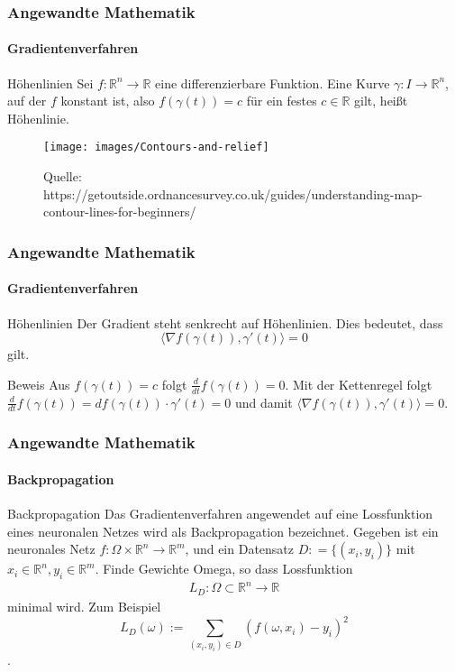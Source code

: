 \documentclass{beamer}
\begin{document}
\begin{frame}
    \frametitle{Angewandte Mathematik}
\framesubtitle{Gradientenverfahren}
    \begin{block}{Höhenlinien}
Sei  $f: \mathbb{R}^n \to \mathbb{R}$  eine differenzierbare Funktion. Eine Kurve $\gamma : I \to \mathbb{R}^n$, auf der $f$ konstant ist, also 
$f(\gamma(t)) = c$ für ein festes $c \in \mathbb{R}$ gilt, heißt Höhenlinie.
\end{block}

\begin{figure}[H]
      \centering
    \texttt{[image: images/Contours-and-relief]}
      \caption{Quelle: https://getoutside.ordnancesurvey.co.uk/guides/understanding-map-contour-lines-for-beginners/}
\end{figure}

 \end{frame}


\begin{frame}
    \frametitle{Angewandte Mathematik}
\framesubtitle{Gradientenverfahren}
    \begin{block}{Höhenlinien}
Der Gradient steht senkrecht auf  Höhenlinien. Dies bedeutet, dass $$ \bigl \langle \nabla f(\gamma(t)), \gamma'(t) \bigr \rangle = 0$$ gilt. 

\end{block}
    \begin{block}{Beweis}
Aus $f(\gamma(t)) = c$ folgt $\frac{d}{dt} f(\gamma(t)) = 0$. Mit der Kettenregel folgt $\frac{d}{dt} f(\gamma(t)) =  df(\gamma(t)) \cdot \gamma'(t) = 0$ und damit
$ \bigl \langle \nabla f(\gamma(t)), \gamma'(t) \bigr \rangle = 0$.
\end{block}

 \end{frame}



\begin{frame}
    \frametitle{Angewandte Mathematik}
\framesubtitle{Backpropagation}
    \begin{block}{Backpropagation}
Das Gradientenverfahren angewendet auf eine Lossfunktion eines neuronalen Netzes wird als Backpropagation bezeichnet.
Gegeben ist ein neuronales Netz $f : \Omega \times \mathbb{R}^n \to \mathbb{R}^m$, 
und ein  Datensatz $D : = \{ (x_i, y_i) \}$ mit $x_i \in \mathbb{R}^n, y_i \in \mathbb{R}^m$. Finde Gewichte Omega, so dass Lossfunktion
\begin{align*}
L_D  : \Omega \subset \mathbb{R}^n \to \mathbb{R} 
\end{align*}
minimal wird. Zum Beispiel $$L_D(\omega) := \sum_{(x_i,y_i) \in D} (f(\omega, x_i) - y_i)^2$$.

\end{block}
 \end{frame}
\end{document}
